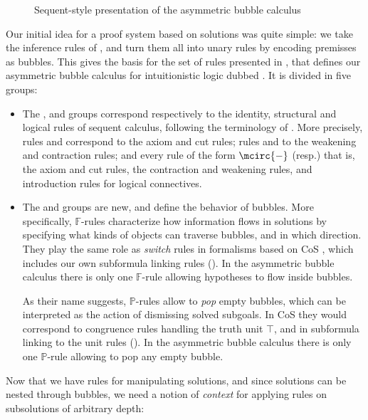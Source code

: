 \begin{figure*}
  
  \caption{Sequent-style presentation of the asymmetric bubble calculus }
\end{figure*}

Our initial idea for a proof system based on solutions was quite simple: we take
the inference rules of , and turn them all into unary rules by encoding
premisses as bubbles. This gives the basis for the set of rules presented in
, that defines our asymmetric bubble
calculus for intuitionistic logic dubbed . It is divided in five groups:
\begin{itemize}
  \item The {\identity}, {\resource} and {\heating} groups correspond
  respectively to the identity, structural and logical rules of sequent
  calculus, following the terminology of . More
  precisely, rules {} and {} correspond
  to the axiom and cut rules; rules {} and {} to the weakening
  and contraction rules; and every rule of the form $\mcirc{-}$ (resp.) that
  is, the axiom and cut rules, the contraction and weakening rules, and
  introduction rules for logical connectives.
  \item The {\flow} and {\popping} groups are new, and define the behavior of
  bubbles. More specifically, $\mathbb{F}$-rules characterize how information
  flows in solutions by specifying what kinds of objects can traverse bubbles,
  and in which direction. They play the same role as \emph{switch} rules in
  formalisms based on CoS \cite{Guglielmi1999ACO}, which includes our own
  subformula linking rules (). In the asymmetric bubble calculus
  there is only one $\mathbb{F}$-rule {} allowing hypotheses to flow
  inside bubbles.
  
  As their name suggests, $\mathbb{P}$-rules allow to \emph{pop} empty bubbles,
  which can be interpreted as the action of dismissing solved subgoals. In CoS
  they would correspond to congruence rules handling the truth unit $\top$, and
  in subformula linking to the unit rules (). In the asymmetric
  bubble calculus there is only one $\mathbb{P}$-rule {} allowing to
  pop any empty bubble.
\end{itemize}

Now that we have rules for manipulating solutions, and since solutions can be
nested through bubbles, we need a notion of \emph{context} for applying rules on
subsolutions of arbitrary depth:

